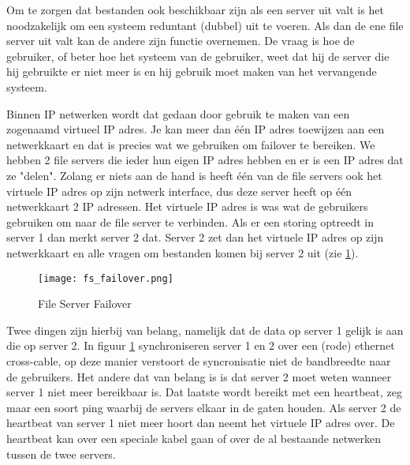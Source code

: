 Om te zorgen dat bestanden ook beschikbaar zijn als een server uit valt is het noodzakelijk om een systeem reduntant (dubbel) uit te voeren. Als dan de ene file server uit valt kan de andere zijn  functie overnemen. De vraag is hoe de gebruiker, of beter hoe het systeem van de gebruiker, weet dat hij de server die hij gebruikte er niet meer is en hij gebruik moet maken van het vervangende systeem.

Binnen IP netwerken wordt dat gedaan door gebruik te maken van een zogenaamd virtueel IP adres. Je kan meer dan \'e\'en IP adres toewijzen aan een netwerkkaart en dat is precies wat we gebruiken om failover te bereiken. We hebben 2 file servers die ieder hun eigen IP adres hebben en er is een IP adres dat ze "delen". Zolang er niets aan de hand is heeft \'e\'en van de file servers ook het virtuele IP adres op zijn netwerk interface, dus deze server heeft op \'e\'en netwerkkaart 2 IP adressen. Het virtuele IP adres is was wat de gebruikers gebruiken om naar de file server te verbinden. Als er een storing optreedt in server 1 dan merkt server 2 dat. Server 2 zet dan het virtuele IP adres op zijn netwerkkaart en alle vragen om bestanden komen bij server 2 uit (zie \ref{FS_failover}).

\begin{figure}[h!]
	\texttt{[image: fs\_failover.png]}
	\caption{File Server Failover}
	\label{FS_failover}
\end{figure}

Twee dingen zijn hierbij van belang, namelijk dat de data op server 1 gelijk is aan die op server 2. In figuur \ref{FS_failover} synchroniseren server 1 en 2 over een (rode) ethernet cross-cable, op deze manier verstoort de syncronisatie niet de bandbreedte naar de gebruikers. Het andere dat van belang is is dat server 2 moet weten wanneer server 1 niet meer bereikbaar is. Dat laatste wordt bereikt met een heartbeat, zeg maar een soort ping waarbij de servers elkaar in de gaten houden. Als server 2 de heartbeat van server 1 niet meer hoort dan neemt het virtuele IP adres over. De heartbeat kan over een speciale kabel gaan of over de al bestaande netwerken tussen de twee servers.

